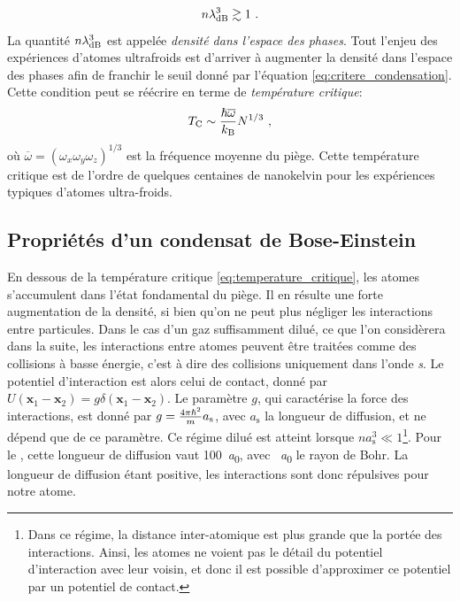 \begin{equation}
n \lambda_{\mathrm{dB}}^3 \gtrsim 1 \text{ .}
\label{eq:critere_condensation}
\end{equation}
La quantité $n \lambda_{\mathrm{dB}}^3$ est appelée \emph{densité dans l'espace des phases}. Tout l'enjeu des expériences d'atomes ultrafroids est d'arriver à augmenter la densité dans l'espace des phases afin de franchir le seuil donné par l'équation \ref{eq:critere_condensation}. Cette condition peut se réécrire en terme de \emph{température critique}:
\begin{equation}
T_{\mathrm{C}}\sim \frac{\hslash \overline{\omega}}{k_{\mathrm{B}}}N^{1/3} \text{ ,}
\label{eq:temperature_critique}
\end{equation}
où $\overline{\omega}=(\omega_x \omega_y \omega_z)^{1/3}$ est la fréquence moyenne du piège. Cette température critique est de l'ordre de quelques centaines de nanokelvin pour les expériences typiques d'atomes ultra-froids.





\subsection{Propriétés d'un condensat de Bose-Einstein}
\label{sc:propriete_BEC}
En dessous de la température critique \ref{eq:temperature_critique}, les atomes s'accumulent dans l'état fondamental du piège. Il en résulte une forte augmentation de la densité, si bien qu'on ne peut plus négliger les interactions entre particules. Dans le cas d'un gaz suffisamment dilué, ce que l'on considèrera dans la suite, les interactions entre atomes peuvent être traitées comme des collisions à basse énergie, c'est à dire des collisions uniquement dans l'onde \emph{s}. Le potentiel d'interaction est alors celui de contact, donné par $U(\mathbf{x}_1-\mathbf{x}_2)=g\delta(\mathbf{x}_1-\mathbf{x}_2)$. Le paramètre $g$, qui caractérise la force des interactions, est donné par $g=\frac{4 \pi \hslash^2}{m}a_{\mathrm{s}}$, avec $a_{\mathrm{s}}$ la longueur de diffusion, et ne dépend que de ce paramètre. Ce régime dilué est atteint lorsque $na_{\mathrm{s}}^3\ll 1$\footnote{Dans ce régime, la distance inter-atomique est plus grande que la portée des interactions. Ainsi, les atomes ne voient pas le détail du potentiel d'interaction avec leur voisin, et donc il est possible d'approximer ce potentiel par un potentiel de contact.}. Pour le , cette longueur de diffusion vaut \SI{100}{\bohr}, avec \SI{}{\bohr} le rayon de Bohr. La longueur de diffusion étant positive, les interactions sont donc répulsives pour notre atome.

